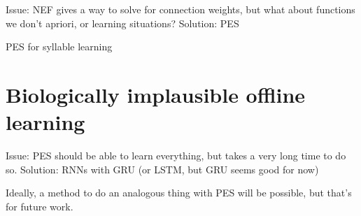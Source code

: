 Issue: NEF gives a way to solve for connection weights,
but what about functions we don't apriori,
or learning situations?
Solution: PES

PES for syllable learning

\section{Biologically implausible offline learning}

Issue: PES should be able to learn everything,
but takes a very long time to do so.
Solution: RNNs with GRU (or LSTM, but GRU seems good for now)

Ideally, a method to do an analogous thing with PES
will be possible, but that's for future work.

